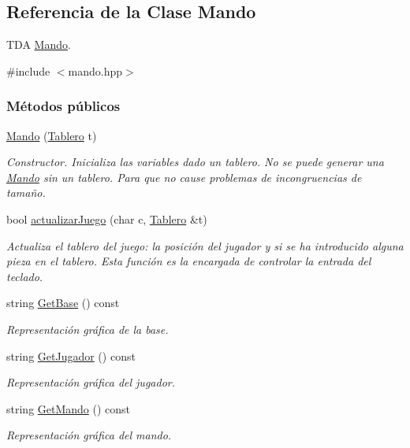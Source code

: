 \hypertarget{classMando}{\subsection{Referencia de la Clase Mando}
\label{classMando}
}


T\-D\-A \hyperlink{classMando}{Mando}.  




{\ttfamily \#include $<$mando.\-hpp$>$}

\subsubsection*{Métodos públicos}
\begin{DoxyCompactItemize}
\item 
\hyperlink{classMando_a2e2ed3e8f3502f7d99cee3e1278cafb9}{Mando} (\hyperlink{classTablero}{Tablero} t)
\begin{DoxyCompactList}\small\item\em Constructor. Inicializa las variables dado un tablero. No se puede generar una \hyperlink{classMando}{Mando} sin un tablero. Para que no cause problemas de incongruencias de tamaño. \end{DoxyCompactList}\item 
bool \hyperlink{classMando_ac65c5bfbd7c268e1916c96b9e71e66f9}{actualizar\-Juego} (char c, \hyperlink{classTablero}{Tablero} \&t)
\begin{DoxyCompactList}\small\item\em Actualiza el tablero del juego\-: la posición del jugador y si se ha introducido alguna pieza en el tablero. Esta función es la encargada de controlar la entrada del teclado. \end{DoxyCompactList}\item 
string \hyperlink{classMando_abcc813b0881e56ed976eea2ce6b7fd12}{Get\-Base} () const 
\begin{DoxyCompactList}\small\item\em Representación gráfica de la base. \end{DoxyCompactList}\item 
string \hyperlink{classMando_aaf8c918ecbce5c8173fcf40e04c8b0b7}{Get\-Jugador} () const 
\begin{DoxyCompactList}\small\item\em Representación gráfica del jugador. \end{DoxyCompactList}\item 
string \hyperlink{classMando_a7e02a04343208f949a88e720ba63a281}{Get\-Mando} () const 
\begin{DoxyCompactList}\small\item\em Representación gráfica del mando. \end{DoxyCompactList}\end{DoxyCompactItemize}
